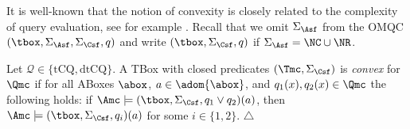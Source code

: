\documentclass{lmcs}
\theoremstyle{definition}
\begin{document}
It is well-known that the notion of convexity is closely related to
the complexity of query evaluation, see for example
\cite{DBLP:conf/lpar/KrisnadhiL07,DBLP:journals/lmcs/LutzW17}.
Recall that we omit $\Sigma_{\Asf}$ from the OMQC $(\tbox,\Sigma_{\Asf},\Sigma_{\Csf},q)$ 
and write $(\tbox,\Sigma_{\Csf},q)$ if $\Sigma_{\Asf}=\NC\cup \NR$.
% 
\begin{defi}\label{def:convex_tbox}
  Let $\mathcal{Q}\in \{\text{tCQ},\text{dtCQ}\}$. A TBox with closed predicates $(\Tmc,\Sigma_\Csf)$ is 
  \emph{convex} for $\Qmc$ if for all ABoxes $\abox$, $a\in\adom{\abox}$, and $q_1(x), q_2(x)\in \Qmc$ 
  the following holds: 
  if $\Amc\models (\tbox,\Sigma_\Csf,q_1\vee q_2)(a)$, then $\Amc\models (\tbox,\Sigma_\Csf,q_{i})(a)$ 
  for some $i \in \{1,2\}$.
  \hfill$\triangle$
\end{defi}
\end{document}
